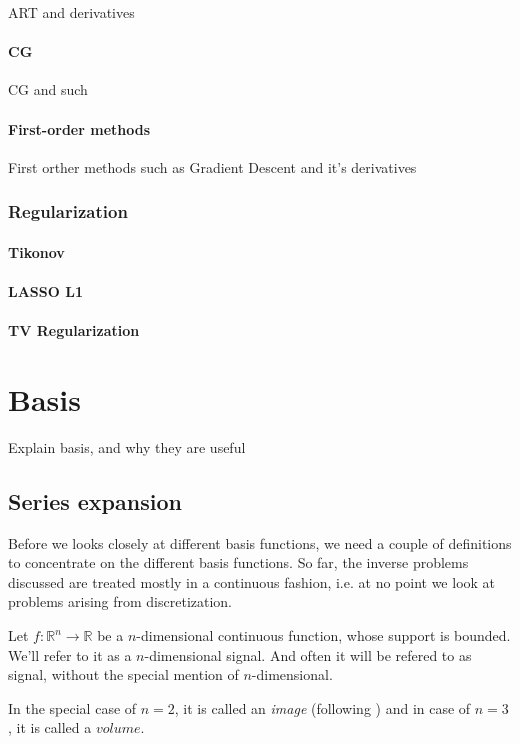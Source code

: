 ART and derivatives

\subsubsection{CG}

CG and such
 
\subsubsection{First-order methods}

First orther methods such as Gradient Descent and it's derivatives

\subsection{Regularization}

\subsubsection{Tikonov}

\subsubsection{LASSO L1}

\subsubsection{TV Regularization}

\chapter{Basis}

Explain basis, and why they are useful

\section{Series expansion}

Before we looks closely at different basis functions, we need a couple of definitions to concentrate
on the different basis functions. So far, the inverse problems discussed are treated mostly in a
continuous fashion, i.e. at no point we look at problems arising from discretization.

\begin{definition}[Signal]
    \label{def:signal}
    Let $f: \mathbb{R}^n \to \mathbb{R}$ be a $n$-dimensional continuous function, whose support is 
    bounded. We'll refer to it as a $n$-dimensional signal. And often it will be refered to as signal, 
    without the special mention of $n$-dimensional.

    In the special case of $n=2$, it is called an \textit{image} (following \cite{herman_basis_2015})
    and in case of $n=3$, it is called a $volume$.
\end{definition}

